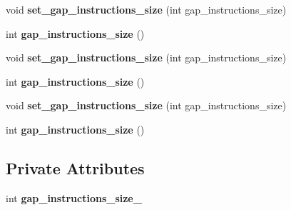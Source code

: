 \begin{DoxyCompactItemize}
\item 
void {\bfseries set\+\_\+gap\+\_\+instructions\+\_\+size} (int gap\+\_\+instructions\+\_\+size)\hypertarget{classv8_1_1internal_1_1_l_lazy_bailout_a7509286bd9c0e27f64f58708abdd00ff}{}\label{classv8_1_1internal_1_1_l_lazy_bailout_a7509286bd9c0e27f64f58708abdd00ff}

\item 
int {\bfseries gap\+\_\+instructions\+\_\+size} ()\hypertarget{classv8_1_1internal_1_1_l_lazy_bailout_aa6b2a86278324e4287fe8faa7aef8450}{}\label{classv8_1_1internal_1_1_l_lazy_bailout_aa6b2a86278324e4287fe8faa7aef8450}

\item 
void {\bfseries set\+\_\+gap\+\_\+instructions\+\_\+size} (int gap\+\_\+instructions\+\_\+size)\hypertarget{classv8_1_1internal_1_1_l_lazy_bailout_a7509286bd9c0e27f64f58708abdd00ff}{}\label{classv8_1_1internal_1_1_l_lazy_bailout_a7509286bd9c0e27f64f58708abdd00ff}

\item 
int {\bfseries gap\+\_\+instructions\+\_\+size} ()\hypertarget{classv8_1_1internal_1_1_l_lazy_bailout_aa6b2a86278324e4287fe8faa7aef8450}{}\label{classv8_1_1internal_1_1_l_lazy_bailout_aa6b2a86278324e4287fe8faa7aef8450}

\item 
void {\bfseries set\+\_\+gap\+\_\+instructions\+\_\+size} (int gap\+\_\+instructions\+\_\+size)\hypertarget{classv8_1_1internal_1_1_l_lazy_bailout_a7509286bd9c0e27f64f58708abdd00ff}{}\label{classv8_1_1internal_1_1_l_lazy_bailout_a7509286bd9c0e27f64f58708abdd00ff}

\item 
int {\bfseries gap\+\_\+instructions\+\_\+size} ()\hypertarget{classv8_1_1internal_1_1_l_lazy_bailout_aa6b2a86278324e4287fe8faa7aef8450}{}\label{classv8_1_1internal_1_1_l_lazy_bailout_aa6b2a86278324e4287fe8faa7aef8450}

\end{DoxyCompactItemize}
\subsection*{Private Attributes}
\begin{DoxyCompactItemize}
\item 
int {\bfseries gap\+\_\+instructions\+\_\+size\+\_\+}\hypertarget{classv8_1_1internal_1_1_l_lazy_bailout_a52bd1c739ebe8fe811b8e0fdb3cdbf9f}{}\label{classv8_1_1internal_1_1_l_lazy_bailout_a52bd1c739ebe8fe811b8e0fdb3cdbf9f}

\end{DoxyCompactItemize}
